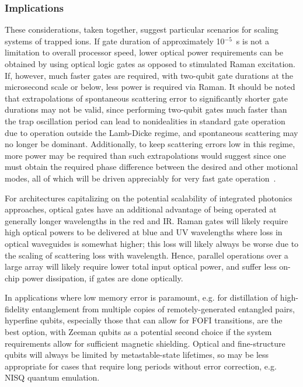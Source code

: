 \documentclass[%
12pt,
 amsmath,amssymb,
]{revtex4-2}
\begin{document}
\subsubsection{Implications}

These considerations, taken together, suggest particular scenarios for scaling systems of trapped ions.  If gate duration of approximately 10$^{-5}$~s is not a limitation to overall processor speed, lower optical power requirements can be obtained by using optical logic gates as opposed to stimulated Raman excitation.  If, however, much faster gates are required, with two-qubit gate durations at the microsecond scale or below, less power is required via Raman. It should be noted that extrapolations of spontaneous scattering error to significantly shorter gate durations may not be valid, since performing two-qubit gates much faster than the trap oscillation period can lead to nonidealities in standard gate operation due to operation outside the Lamb-Dicke regime, and spontaneous scattering may no longer be dominant.  Additionally, to keep scattering errors low in this regime, more power may be required than such extrapolations would suggest since one must obtain the required phase difference between the desired and other motional modes, all of which will be driven appreciably for very fast gate operation~\cite{SteanePulseGates2014}.

For architectures capitalizing on the potential scalability of integrated photonics approaches, optical gates have an additional advantage of being operated at generally longer wavelengths in the red and IR. Raman gates will likely require high optical powers to be delivered at blue and UV wavelengths where loss in optical waveguides is somewhat higher; this loss will likely always be worse due to the scaling of scattering loss with wavelength.  Hence, parallel operations over a large array will likely require lower total input optical power, and suffer less on-chip power dissipation, if gates are done optically.

In applications where low memory error is paramount, e.g. for distillation of high-fidelity entanglement from multiple copies of remotely-generated entangled pairs, hyperfine qubits, especially those that can allow for FOFI transitions, are the best option, with Zeeman qubits as a potential second choice if the system requirements allow for sufficient magnetic shielding.  Optical and fine-structure qubits will always be limited by metastable-state lifetimes, so may be less appropriate for cases that require long periods without error correction, e.g. NISQ quantum emulation.
\end{document}
